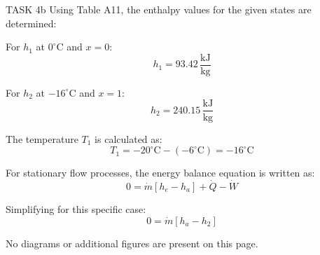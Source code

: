 TASK 4b  
Using Table A11, the enthalpy values for the given states are determined:  

For \( h_1 \) at \( 0^\circ\text{C} \) and \( x = 0 \):  
\[
h_1 = 93.42 \, \frac{\text{kJ}}{\text{kg}}
\]  

For \( h_2 \) at \( -16^\circ\text{C} \) and \( x = 1 \):  
\[
h_2 = 240.15 \, \frac{\text{kJ}}{\text{kg}}
\]  

The temperature \( T_1 \) is calculated as:  
\[
T_1 = -20^\circ\text{C} - (-6^\circ\text{C}) = -16^\circ\text{C}
\]  

For stationary flow processes, the energy balance equation is written as:  
\[
0 = \dot{m} \left[ h_e - h_a \right] + \dot{Q} - \dot{W}
\]  

Simplifying for this specific case:  
\[
0 = \dot{m} \left[ h_a - h_2 \right]
\]  

No diagrams or additional figures are present on this page.